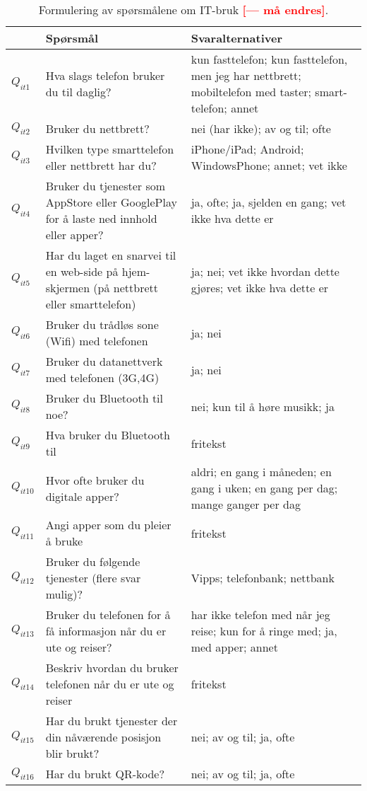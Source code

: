 \documentclass[11pt,english]{nik}
\newcommand{\WVL}[1]{\textbf{\textcolor{red}{#1}}}
\begin{document}
\begin{sidewaystable}
    \caption{Formulering av spørsmålene om IT-bruk \WVL{[--- må endres]}.} \label{tab:questions:it}
\centering\small
\begin{tabular}{lp{.43\hsize}p{.43\hsize}}
 & Spørsmål & Svaralternativer \\
\hline
\(Q_{it1}\) & Hva slags telefon bruker du til daglig?  & kun fasttelefon; kun fasttelefon, men jeg har nettbrett; mobiltelefon med taster; smart-telefon; annet \\
\(Q_{it2}\) & Bruker du nettbrett?  & nei (har ikke); av og til; ofte \\
\(Q_{it3}\) & Hvilken type smarttelefon eller nettbrett har du?  & iPhone/iPad; Android; WindowsPhone; annet; vet ikke\\
\(Q_{it4}\) &  Bruker du tjenester som AppStore eller GooglePlay for å laste ned innhold eller apper? & ja, ofte; 
ja, sjelden en gang; vet ikke hva dette er \\
\(Q_{it5}\) &  Har du laget en snarvei til en web-side på hjem-skjermen (på nettbrett eller
smarttelefon) & ja; nei; vet ikke hvordan dette gjøres; vet ikke hva dette er \\
\(Q_{it6}\) &  Bruker du trådløs sone (Wifi) med telefonen & ja; nei \\
\(Q_{it7}\) &  Bruker du datanettverk med telefonen (3G,4G) & ja; nei \\
\(Q_{it8}\) &  Bruker du Bluetooth til noe? & nei; kun til å høre musikk; ja \\
\(Q_{it9}\) &  Hva bruker du Bluetooth til & fritekst \\
\(Q_{it10}\) &  Hvor ofte bruker du digitale apper? & aldri; en gang i måneden; en gang i uken; en gang per dag; mange ganger per dag\\
\(Q_{it11}\) &  Angi apper som du pleier å bruke & fritekst \\
\(Q_{it12}\) &  Bruker du følgende tjenester (flere svar mulig)? & Vipps; telefonbank; nettbank \\
\(Q_{it13}\) &  Bruker du telefonen for å få informasjon når du er ute og reiser? & har ikke telefon med når jeg reise; kun for å ringe med; ja, med apper; annet \\
\(Q_{it14}\) &  Beskriv hvordan du bruker telefonen når du er ute og reiser & fritekst \\
\(Q_{it15}\) &  Har du brukt tjenester der din nåværende posisjon blir brukt? & nei; av og til; ja, ofte\\
\(Q_{it16}\) &  Har du brukt QR-kode? & nei; av og til; ja, ofte\\
\end{tabular}
\end{sidewaystable}
\end{document}
